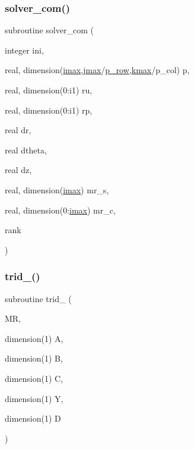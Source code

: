 \mbox{\label{solver_8f_ac440afb4699e9aaf116567db907fbe0a}} 
\subsubsection{\texorpdfstring{solver\+\_\+com()}{solver\_com()}}
{\footnotesize\ttfamily subroutine solver\+\_\+com (\begin{DoxyParamCaption}\item[{integer}]{ini,  }\item[{real, dimension(\hyperlink{param_8h_a788916a7426baf172c67386359720d6d}{imax},\hyperlink{param_8h_ac5c80d846ec0c4cf1c91fc5d9d66faa1}{jmax}/\hyperlink{param_8h_a149afb59990224def797b29467985bac}{p\+\_\+row},\hyperlink{param_8h_ae0453dd20a7c6a923904df942ef82468}{kmax}/p\+\_\+col)}]{p,  }\item[{real, dimension(0\+:i1)}]{ru,  }\item[{real, dimension(0\+:i1)}]{rp,  }\item[{real}]{dr,  }\item[{real}]{dtheta,  }\item[{real}]{dz,  }\item[{real, dimension(\hyperlink{param_8h_a788916a7426baf172c67386359720d6d}{imax})}]{mr\+\_\+s,  }\item[{real, dimension(0\+:\hyperlink{param_8h_a788916a7426baf172c67386359720d6d}{imax})}]{mr\+\_\+c,  }\item[{}]{rank }\end{DoxyParamCaption})}

\mbox{\label{solver_8f_a79ec1c9d10f32a5e44da1ba7ba5b6374}} 
\subsubsection{\texorpdfstring{trid\+\_()}{trid\_2()}}
{\footnotesize\ttfamily subroutine trid\+\_ (\begin{DoxyParamCaption}\item[{}]{MR,  }\item[{dimension(1)}]{A,  }\item[{dimension(1)}]{B,  }\item[{dimension(1)}]{C,  }\item[{dimension(1)}]{Y,  }\item[{dimension(1)}]{D }\end{DoxyParamCaption})}

